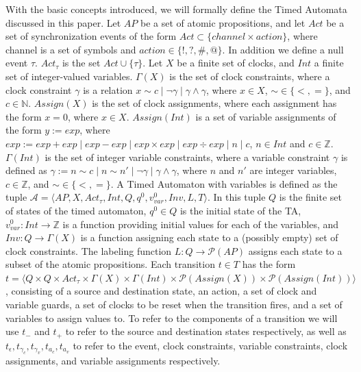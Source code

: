 \documentclass[a4paper,12pt]{article}
\newcommand*\BitOr{\mathbin{|}}
\begin{document}
With the basic concepts introduced, we will formally define the Timed Automata
discussed in this paper. Let \(AP\) be a set of atomic propositions, and let \(Act\) be a set of
synchronization events of the form $Act \subset \{channel \times action\}$,
where channel is a set of symbols and $action \in \{!,?,\#,@\}$. In addition we
define a null event \(\tau\). \(Act_{\tau}\) is the set \(Act \cup \{\tau\}\).
Let \(X\) be a finite set of clocks, and \(Int\) a finite set of integer-valued
variables. \(\Gamma(X)\) is the set of clock constraints, where a clock
constraint \(\gamma\) is a relation
\(x \sim c \BitOr \neg \gamma\BitOr \gamma \land \gamma\), where \(x \in X\),
\(\sim \in \{<,=\}\), and \(c \in \mathbb{N}\). \(Assign(X)\) is the set of
clock assignments, where each assignment has the form \(x {=} 0\), where
\(x \in X\iffalse{,\ c {\in} \mathbb{Z}^+}\fi\). \(Assign(Int)\) is a set of
variable assignments of the form \(y := exp\), where
\(exp := exp + exp\BitOr exp - exp\BitOr exp \times exp\BitOr exp \div exp\BitOr n\BitOr c\),
\(n \in Int\) and \(c \in \mathbb{Z}\). \(\Gamma(Int)\) is the set of integer
variable constraints, where a variable constraint \(\gamma\) is defined as
\(\gamma := n \sim c\BitOr n \sim n'\BitOr \neg \gamma\BitOr \gamma \land \gamma\),
where \(n\) and \(n'\) are integer variables, \(c \in \mathbb{Z}\), and
\(\sim \in \{<,=\}\). A Timed Automaton with variables is defined as the tuple
\(\mathcal{A} = \big \langle AP,X, Act_{\tau}, Int, Q, q^0, v_{var}^0, Inv, L, T \big \rangle\).
In this tuple \(Q\) is the finite set of states of the timed automaton,
\(q^0 \in Q\) is the initial state of the TA,
\(v_{var}^{0} : Int \rightarrow \mathbb{Z}\) is a function providing initial
values for each of the variables, and \(Inv : Q \rightarrow \Gamma(X)\) is a
function assigning each state to a (possibly empty) set of clock constraints.
The labeling function \(L: Q \rightarrow \mathcal{P}(AP)\) assigns each state to
a subset of the atomic propositions. Each transition \(t \in T\) has the form
\(t = \big \langle Q \times Q \times Act_{\tau} \times \Gamma(X) \times \Gamma(Int) \times \mathcal{P}(Assign(X)) \times \mathcal{P}(Assign(Int)) \big \rangle \),
consisting of a source and destination state, an action, a set of clock and
variable guards, a set of clocks to be reset when the transition fires, and a
set of variables to assign values to. To refer to the components of a transition
we will use \(t_-\) and \(t_+\) to refer to the source and destination states
respectively, as well as
\(t_\epsilon, t_{\gamma_c}, t_{\gamma_v}, t_{a_c}, t_{a_v}\) to refer to the
event, clock constraints, variable constraints, clock assignments, and variable
assignments respectively.
\end{document}
